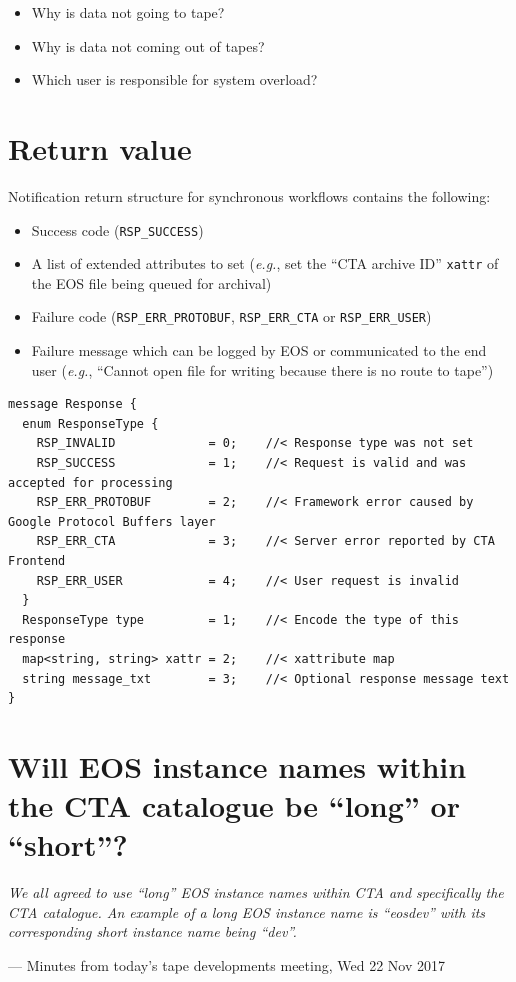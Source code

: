 \begin{itemize}
\item Why is data not going to tape?
\item Why is data not coming out of tapes?
\item Which user is responsible for system overload?
\end{itemize}

\section{Return value \resolved}

Notification return structure for synchronous workflows contains the following:
\begin{itemize}
   \item Success code (\texttt{RSP\_SUCCESS})
   \item A list of extended attributes to set (\textit{e.g.}, set the ``CTA archive ID'' \texttt{xattr} of the EOS file being queued for archival)
   \item Failure code (\texttt{RSP\_ERR\_PROTOBUF}, \texttt{RSP\_ERR\_CTA} or \texttt{RSP\_ERR\_USER})
   \item Failure message which can be logged by EOS or communicated to the end user (\textit{e.g.}, ``Cannot open file for writing because there is no route to tape'')
\end{itemize}

\begin{lstlisting}
message Response {
  enum ResponseType {
    RSP_INVALID             = 0;    //< Response type was not set
    RSP_SUCCESS             = 1;    //< Request is valid and was accepted for processing
    RSP_ERR_PROTOBUF        = 2;    //< Framework error caused by Google Protocol Buffers layer
    RSP_ERR_CTA             = 3;    //< Server error reported by CTA Frontend
    RSP_ERR_USER            = 4;    //< User request is invalid
  }
  ResponseType type         = 1;    //< Encode the type of this response
  map<string, string> xattr = 2;    //< xattribute map
  string message_txt        = 3;    //< Optional response message text
}
\end{lstlisting}

\section{Will EOS instance names within the CTA catalogue be ``long'' or ``short''? \resolved}

\textit{We all agreed to use ``long'' EOS instance names within CTA and specifically the CTA catalogue. An example of a
long EOS instance name is ``eosdev'' with its corresponding short instance name being ``dev''.}
\begin{flushright}
--- Minutes from today's tape developments meeting, Wed 22 Nov 2017
\end{flushright}

